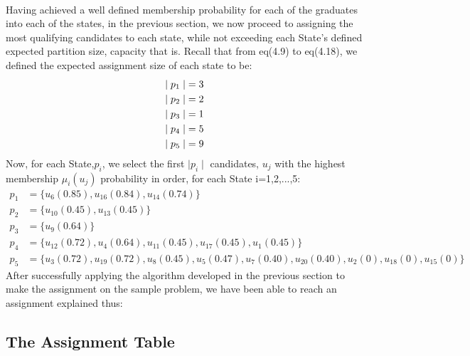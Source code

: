 \documentclass[a4paper,openany]{book}
\begin{document}
			\paragraph{}
				Having achieved a well defined membership probability for each of the graduates into each of the states, in the previous section, we now proceed to assigning the most qualifying candidates to each state, while not exceeding each State's defined expected partition size, capacity that is.
				Recall that from eq(4.9) to eq(4.18), we defined the expected assignment size of each state to be:
				\begin{align}
					\mid p_1 \mid &= 3 \notag \\
					\mid p_2 \mid &= 2 \notag \\
					\mid p_3 \mid &= 1 \notag \\
					\mid p_4 \mid &= 5 \notag \\
					\mid p_5 \mid &= 9 \notag
				\end{align}
				Now, for each State,$p_i$, we select the first $\mid p_i \mid$ candidates, $u_j$ with the highest membership $\mu_i(u_j)$ probability in order, for each State i=1,2,...,5:
				\begin{align}
					p_1 &= \{u_6(0.85), u_{16}(0.84), u_{14}(0.74)\}\\
					p_2 &= \{u_{10}(0.45), u_{13}(0.45)\}\\
					p_3 &= \{u_{9}(0.64)\}\\
					p_4 &= \{u_{12}(0.72),u_{4}(0.64),u_{11}(0.45),u_{17}(0.45),u_{1}(0.45)\}\\
					p_5 &= \{u_{3}(0.72),u_{19}(0.72),u_{8}(0.45),u_{5}(0.47),u_{7}(0.40),u_{20}(0.40),u_{2}(0),u_{18}(0),u_{15}(0)\}
				\end{align}
				After successfully applying the algorithm developed in the previous section to make the assignment on the sample problem, we have been able to reach an assignment explained thus:
				\subsection{The Assignment Table}
\end{document}
